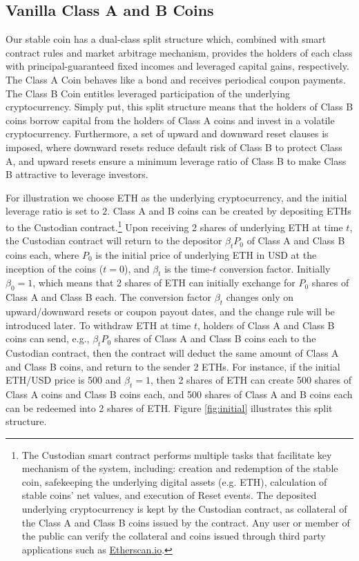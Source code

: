 \documentclass[final,pdftex]{ectaart}
\theoremstyle{plain}
\begin{document}
\subsection{Vanilla Class A and B Coins}\label{subsect:vanilla}

Our stable coin has a dual-class split structure which, combined with smart contract rules and market arbitrage mechanism, provides the holders of each class with principal-guaranteed fixed incomes and leveraged capital gains, respectively. The Class A Coin behaves like a bond and receives periodical coupon payments. The Class B Coin entitles leveraged participation of the underlying cryptocurrency. Simply put, this split structure means that the holders of Class B coins borrow capital from the holders of Class A coins and invest in a volatile cryptocurrency. Furthermore, a set of upward and downward reset clauses is imposed, where downward resets reduce default risk of Class B to protect Class A, and upward resets ensure a minimum leverage ratio of Class B to make Class B attractive to leverage investors.

For illustration we choose ETH as the underlying cryptocurrency, and the initial leverage ratio is set to $2$. Class A and B coins can be created by depositing ETHs to the Custodian contract.\footnote{The Custodian smart contract performs multiple tasks that facilitate key mechanism of the system, including: creation and redemption of the stable coin, safekeeping the underlying digital assets (e.g. ETH), calculation of stable coins' net values, and execution of Reset events. The deposited underlying cryptocurrency is kept by the Custodian contract, as collateral of the Class A and Class B coins issued by the contract. Any user or member of the public can verify the collateral and coins issued through third party applications such as \href{http://etherscan.io}{Etherscan.io}.} Upon receiving 2 shares of underlying ETH at time $t$, the Custodian contract will return to the depositor $\beta_t P_0 $ of Class A and Class B coins each, where $P_{0}$ is the initial price of underlying ETH in USD at the inception of the coins ($t=0$), and $\beta_t$ is the time-$t$ conversion factor. Initially $\beta_0=1$, which means that 2 shares of ETH can initially exchange for $P_0$ shares of Class A and Class B each. The conversion factor $\beta_t$ changes only on upward/downward resets or coupon payout dates, and the change rule will be introduced later. To withdraw ETH at time $t$, holders of Class A and Class B coins can send, e.g., $\beta_t P_0$ shares of Class A and Class B coins each to the Custodian contract, then the contract will deduct the same amount of Class A and Class B coins, and return to the sender 2 ETHs.
For instance, if the initial ETH/USD price is 500 and $\beta_t=1$, then 2 shares of ETH can create 500 shares of Class A coins and Class B coins each, and 500 shares of Class A and B coins each can be redeemed into 2 shares of ETH. Figure \ref{fig:initial} illustrates this split structure.
\end{document}
